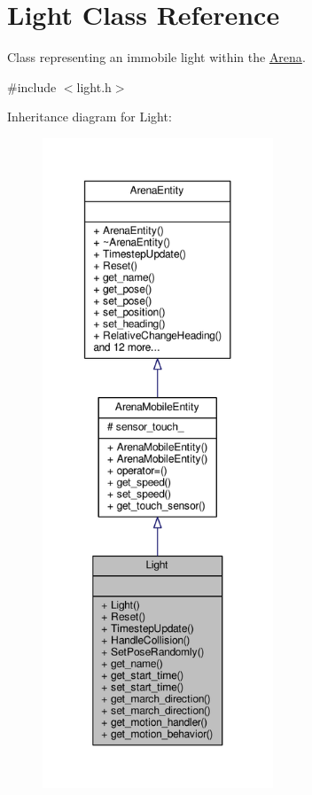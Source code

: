 \hypertarget{classLight}{}\section{Light Class Reference}
\label{classLight}


Class representing an immobile light within the \hyperlink{classArena}{Arena}.  




{\ttfamily \#include $<$light.\+h$>$}



Inheritance diagram for Light\+:\nopagebreak
\begin{figure}[H]
\begin{center}
\leavevmode
\includegraphics[height=550pt]{classLight__inherit__graph}
\end{center}
\end{figure}


